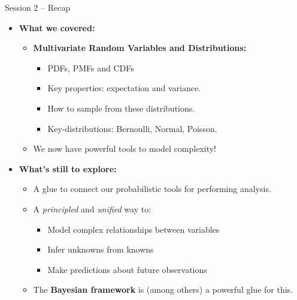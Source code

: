 \documentclass{beamer}
\begin{document}
\begin{frame}{Session 2 – Recap}
  \begin{itemize}
    \item \textbf{What we covered:}
    \begin{itemize}
      \item \textbf{Multivariate Random Variables and Distributions:}
      \begin{itemize}
        \item PDFs, PMFs and CDFs
        \item Key properties: expectation and variance.
        \item How to sample from these distributions.
        \item Key-distributions: Bernoulli, Normal, Poisson.
      \end{itemize}

      \item We now have powerful tools to model complexity!
    \end{itemize}
    \vspace{0.5cm}
    \item \textbf{What’s still to explore:}
    \begin{itemize}
    \item A glue to connect our probabilistic tools for performing analysis.
    \item A \textit{principled} and \textit{unified} way to:
      \begin{itemize}
        \item Model complex relationships between variables
        \item Infer unknowns from knowns
        \item Make predictions about future observations
      \end{itemize}
   \item The \textbf{Bayesian framework} is (among others) a powerful glue for this.
    \end{itemize}
  \end{itemize}
\end{frame}
\end{document}
